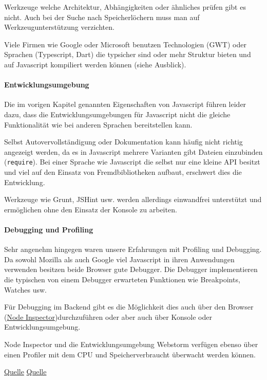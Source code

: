Werkzeuge welche Architektur, Abhängigkeiten oder ähnliches prüfen gibt
es nicht. Auch bei der Suche nach Speicherlöchern muss man auf
Werkzeugunterstützung verzichten.

Viele Firmen wie Google oder Microsoft benutzen Technologien (GWT) oder
Sprachen (Typescript, Dart) die typsicher sind oder mehr Struktur bieten
und auf Javascript kompiliert werden können (siehe Ausblick).

\paragraph{Entwicklungsumgebung}\label{entwicklungsumgebung}

Die im vorigen Kapitel genannten Eigenschaften von Javascript führen
leider dazu, dass die Entwicklungsumgebungen für Javascript nicht die
gleiche Funktionalität wie bei anderen Sprachen bereitstellen kann.

Selbst Autovervollständigung oder Dokumentation kann häufig nicht
richtig angezeigt werden, da es in Javascript mehrere Varianten gibt
Dateien einzubinden (\texttt{require}). Bei einer Sprache wie Javascript
die selbst nur eine kleine API besitzt und viel auf den Einsatz von
Fremdbibliotheken aufbaut, erschwert dies die Entwicklung.

Werkzeuge wie Grunt, JSHint usw. werden allerdings einwandfrei
unterstützt und ermöglichen ohne den Einsatz der Konsole zu arbeiten.

\paragraph{Debugging und Profiling}\label{debugging-und-profiling}

Sehr angenehm hingegen waren unsere Erfahrungen mit Profiling und
Debugging. Da sowohl Mozilla als auch Google viel Javascript in ihren
Anwendungen verwenden besitzen beide Browser gute Debugger. Die Debugger
implementieren die typischen von einem Debugger erwarteten Funktionen
wie Breakpoints, Watches usw.

Für Debugging im Backend gibt es die Möglichkeit dies auch über den
Browser (\href{https://github.com/node-inspector/node-inspector}{Node
Inspector})durchzuführen oder aber auch über Konsole oder
Entwicklungsumgebung.

Node Inspector und die Entwicklungsumgebung Webstorm verfügen ebenso
über einen Profiler mit dem CPU und Speicherverbraucht überwacht werden
können.

\href{https://developer.chrome.com/devtools/docs/javascript-memory-profiling}{Quelle}
\href{https://developer.chrome.com/devtools/docs/cpu-profiling}{Quelle}


